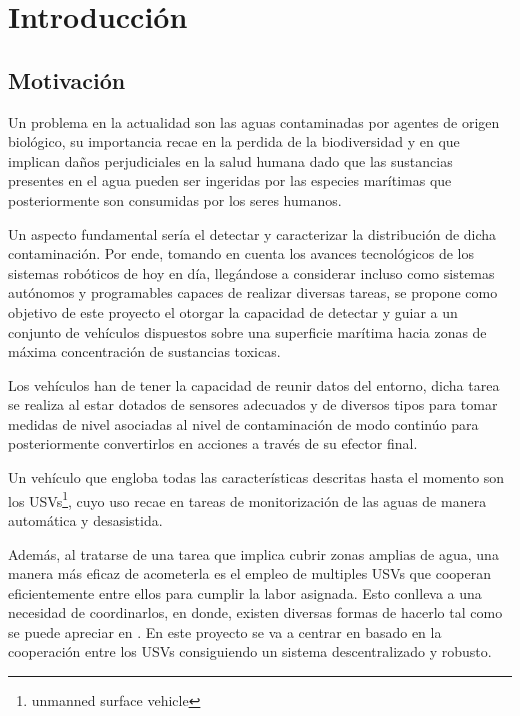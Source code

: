 

\chapter{Introducción} 
\label{ch:chapter1}
\setlength{\parindent}{0cm}
\setlength{\parskip}{4mm}

\section{Motivación}\label{Motiv}

Un problema en la actualidad son las aguas contaminadas por agentes de origen biológico, su importancia recae en la perdida de la biodiversidad y en que implican daños perjudiciales en la salud humana dado que las sustancias presentes en el agua pueden ser ingeridas por las especies marítimas que posteriormente son consumidas por los seres humanos.

Un aspecto fundamental sería el detectar y caracterizar la distribución de dicha contaminación. Por ende, tomando en cuenta los avances tecnológicos de los sistemas robóticos de hoy en día, llegándose a considerar incluso como sistemas autónomos y programables capaces de realizar diversas tareas, se propone como objetivo de este proyecto el otorgar la capacidad de detectar y guiar a un conjunto de vehículos dispuestos sobre una superficie marítima hacia zonas de máxima concentración de sustancias toxicas.

Los vehículos han de tener la capacidad de reunir datos del entorno, dicha tarea se realiza al estar dotados de sensores adecuados y de diversos tipos para tomar medidas de nivel asociadas al nivel de contaminación de modo continúo para posteriormente convertirlos en acciones a través de su efector final.

Un vehículo que engloba todas las características descritas hasta el momento son los USVs\footnote[1]{unmanned surface vehicle}, cuyo uso recae en tareas de monitorización de las aguas de manera automática y desasistida.

Además, al tratarse de una tarea que implica cubrir zonas amplias de agua, una manera más eficaz de acometerla es el empleo de multiples USVs que cooperan eficientemente entre ellos para cumplir la labor asignada. Esto conlleva a una necesidad de coordinarlos, en donde, existen diversas formas de hacerlo tal como se puede apreciar en \cite{Otra_Coorporativa}. En este proyecto se va a centrar en \cite{Control_Formacion} basado en la cooperación entre los USVs consiguiendo un sistema descentralizado y robusto.\\

